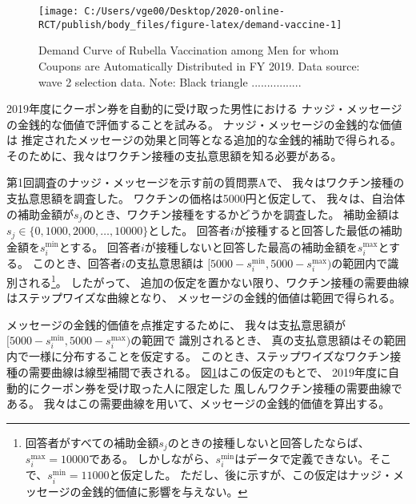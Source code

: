 \documentclass[
  11pt,
  a4paper,
]{article}
\begin{document}
\begin{figure}[t]
\texttt{[image: C:/Users/vge00/Desktop/2020-online-RCT/publish/body\_files/figure-latex/demand-vaccine-1]} \caption{Demand Curve of Rubella Vaccination among Men for whom Coupons are Automatically Distributed in FY 2019. Data source: wave 2 selection data. Note: Black triangle ................}\label{fig:demand-vaccine}
\end{figure}

2019年度にクーポン券を自動的に受け取った男性における
ナッジ・メッセージの金銭的な価値で評価することを試みる。
ナッジ・メッセージの金銭的な価値は
推定されたメッセージの効果と同等となる追加的な金銭的補助で得られる。
そのために、我々はワクチン接種の支払意思額を知る必要がある。

第1回調査のナッジ・メッセージを示す前の質問票Aで、
我々はワクチン接種の支払意思額を調査した。
ワクチンの価格は5000円と仮定して、
我々は、自治体の補助金額が\(s_j\)のとき、ワクチン接種をするかどうかを調査した。
補助金額は\(s_j \in \{0, 1000, 2000, \ldots, 10000\}\)とした。
回答者\(i\)が接種すると回答した最低の補助金額を\(s_i^{\text{min}}\)とする。
回答者\(i\)が接種しないと回答した最高の補助金額を\(s_i^{\text{max}}\)とする。
このとき、回答者\(i\)の支払意思額は
\([5000 - s_i^{\text{min}}, 5000 - s_i^{\text{max}})\)の範囲内で識別される\footnote{回答者がすべての補助金額\(s_j\)のときの接種しないと回答したならば、\(s_i^{\text{max}} = 10000\)である。
  しかしながら、\(s_i^{\text{min}}\)はデータで定義できない。そこで、\(s_i^{\text{min}} = 11000\)と仮定した。
  ただし、後に示すが、この仮定はナッジ・メッセージの金銭的価値に影響を与えない。}。
したがって、
追加の仮定を置かない限り、ワクチン接種の需要曲線はステップワイズな曲線となり、
メッセージの金銭的価値は範囲で得られる。

メッセージの金銭的価値を点推定するために、
我々は支払意思額が
\([5000 - s_i^{\text{min}}, 5000 - s_i^{\text{max}})\)の範囲で
識別されるとき、
真の支払意思額はその範囲内で一様に分布することを仮定する。
このとき、ステップワイズなワクチン接種の需要曲線は線型補間で表される。
図\ref{fig:demand-vaccine}はこの仮定のもとで、
2019年度に自動的にクーポン券を受け取った人に限定した
風しんワクチン接種の需要曲線である。
我々はこの需要曲線を用いて、メッセージの金銭的価値を算出する。
\end{document}
